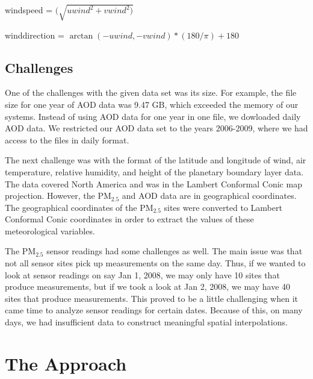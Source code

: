\documentclass[10pt]{article}
\newcommand{\kelly}[1]{{\color{blue}{Kelly: {#1}}}}
\begin{document}
\begin{center}
windspeed = $(\sqrt{uwind^2 + vwind^2)}$

\bigskip

winddirection = $\arctan(-uwind, -vwind) * (180/\pi) + 180$

\end{center}

\subsection{Challenges}
One of the challenges with the given data set was its size. For example, the file size for one year of AOD data was 9.47 GB, which exceeded the memory of our systems. Instead of using AOD data for one year in one file, we dowloaded daily AOD data. We restricted our AOD data set to the years 2006-2009, where we had access to the files in daily format. %

The next challenge was with the format of the latitude and longitude of wind, air temperature, relative humidity, and height of the planetary boundary layer data. The data covered North America and was in the Lambert Conformal Conic map projection. However, the PM$_{2.5}$ and AOD data are in geographical coordinates. The geographical coordinates of the PM$_{2.5}$ sites were converted to Lambert Conformal Conic coordinates in order to extract the values of these meteorological variables. 

The PM$_{2.5}$ sensor readings had some challenges as well. The main issue was that not all sensor sites pick up measurements on the same day. Thus, if we wanted to look at sensor readings on say Jan 1, 2008, we may only have 10 sites that produce measurements, but if we took a look at Jan 2, 2008, we may have 40 sites that produce measurements. This proved to be a little challenging when it came time to analyze sensor readings for certain dates. Because of this, on many days, we had insufficient data to construct meaningful spatial interpolations.





\section{The Approach}
\end{document}
